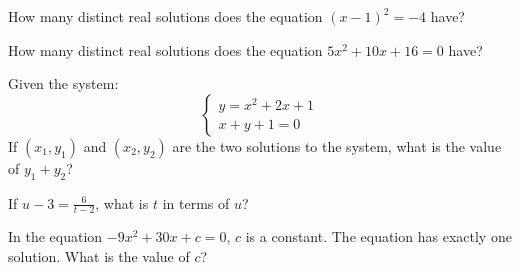 How many distinct real solutions does the equation \((x - 1)^2 = -4\) have?

\vspace{0.75em}


\vspace{2em}

\noindent\markforreview
\vspace{1em}

How many distinct real solutions does the equation  
\(5x^2 + 10x + 16 = 0\) have?

\vspace{0.75em}




\newpage

\noindent\markforreview
\vspace{1em}

Given the system:  
\[
\begin{cases}
y = x^2 + 2x + 1 \\
x + y + 1 = 0
\end{cases}
\]  
If \((x_1, y_1)\) and \((x_2, y_2)\) are the two solutions to the system,  
what is the value of \(y_1 + y_2\)?

\vspace{0.75em}


\vspace{2em}

\noindent\markforreview
\vspace{1em}

If \({u - 3} = \frac{6}{t - 2}\), what is \(t\) in terms of \(u\)?

\vspace{0.75em}




\newpage

\noindent\markforreview
\vspace{1em}

In the equation \(-9x^2 + 30x + c = 0\), \(c\) is a constant.  
The equation has exactly one solution.  
What is the value of \(c\)?


